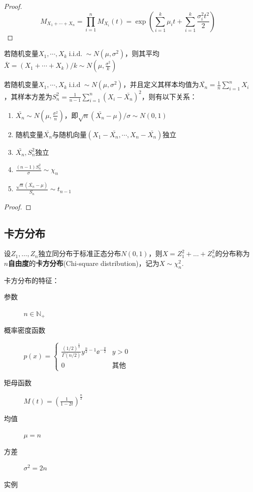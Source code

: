 \begin{proof}
    \[ M_{X_1+\cdots+ X_n} = \prod_{i=1}^n M_{X_i}(t)=\exp (\sum_{i=1}^k\mu_i t + \sum_{i=1}^k \frac{\sigma_i^2 t^2}{2}) \]
\end{proof}

\begin{corollary}
    若随机变量$X_1,\cdots ,X_k \operatorname{i.i.d.} \sim N(\mu,\sigma^2)$，则其平均$\bar{X}=(X_1+\cdots +X_k)/k \sim N(\mu,\frac{\sigma^2}{k})$
\end{corollary}

\begin{theorem}
    若随机变量$X_1,\cdots ,X_k \operatorname{i.i.d} \sim N(\mu,\sigma^2)$，并且定义其样本均值为$\bar{X_n}=\frac{1}{n}\sum_{i=1}^n X_i$，其样本方差为$S_n^2=\frac{1}{n-1}\sum_{i=1}^n (X_i-\bar{X_n})^2$，则有以下关系：
    \begin{enumerate}
        \item $\bar{X_n} \sim N(\mu,\frac{\sigma^2}{n})$，即$\sqrt{n}(\bar{X_n}-\mu)/\sigma \sim N(0,1)$
        \item 随机变量$\bar{X_n}$与随机向量$(X_1-\bar{X_n},\cdots ,X_n-\bar{X_n})$独立
        \item $\bar{X_n},S_n^2$独立
        \item $\frac{(n-1)S_n^2}{\sigma} \sim \chi_n$
        \item $\frac{\sqrt{n}(\bar{X_n}-\mu)}{S_n} \sim t_{n-1}$
    \end{enumerate}
\end{theorem}
\begin{proof}
    
\end{proof}

\subsection{卡方分布}

\begin{definition}
    设$Z_1,\dotsc,Z_n$独立同分布于标准正态分布$N(0,1)$，则$X=Z_1^2+\dotsc+Z_n^2$的分布称为\textbf{$n$自由度}的\textbf{卡方分布}(Chi-square distribution)，记为$X \sim \chi^2_n$.
\end{definition}

卡方分布的特征：
\begin{description}
    \item[参数] $n \in \mathbb{N}_+$
    \item[概率密度函数] $p(x)=\begin{cases}
                \frac{(1/2)^{\frac n2}}{\Gamma(n/2)}y^{\frac n2-1}\ee^{-\frac y2} & y>0         \\
                0                                                                 & \text{其他}
            \end{cases}$
    \item[矩母函数] $M(t)=(\frac{1}{1-2t})^{\frac{n}{2}}$
    \item[均值] $\mu=n$
    \item[方差] $\sigma^2=2n$
    \item[实例]
\end{description}

